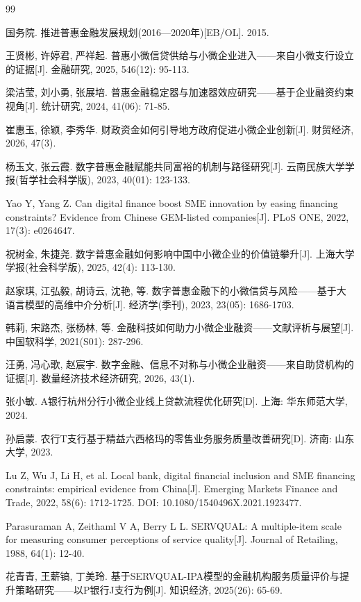 \begin{thebibliography}{99}

 国务院. 推进普惠金融发展规划(2016—2020年)[EB/OL]. 2015.

 王贤彬, 许婷君, 严祥起. 普惠小微信贷供给与小微企业进入——来自小微支行设立的证据[J]. 金融研究, 2025, 546(12): 95-113.

 梁洁莹, 刘小勇, 张展培. 普惠金融稳定器与加速器效应研究——基于企业融资约束视角[J]. 统计研究, 2024, 41(06): 71-85.

 崔惠玉, 徐颖, 李秀华. 财政资金如何引导地方政府促进小微企业创新[J]. 财贸经济, 2026, 47(3).

 杨玉文, 张云霞. 数字普惠金融赋能共同富裕的机制与路径研究[J]. 云南民族大学学报(哲学社会科学版), 2023, 40(01): 123-133.

 Yao Y, Yang Z. Can digital finance boost SME innovation by easing financing constraints? Evidence from Chinese GEM-listed companies[J]. PLoS ONE, 2022, 17(3): e0264647.

 祝树金, 朱捷尧. 数字普惠金融如何影响中国中小微企业的价值链攀升[J]. 上海大学学报(社会科学版), 2025, 42(4): 113-130.

 赵家琪, 江弘毅, 胡诗云, 沈艳, 等. 数字普惠金融下的小微信贷与风险——基于大语言模型的高维中介分析[J]. 经济学(季刊), 2023, 23(05): 1686-1703.

 韩莉, 宋路杰, 张杨林, 等. 金融科技如何助力小微企业融资——文献评析与展望[J]. 中国软科学, 2021(S01): 287-296.

 汪勇, 冯心歌, 赵宸宇. 数字金融、信息不对称与小微企业融资——来自助贷机构的证据[J]. 数量经济技术经济研究, 2026, 43(1).

 张小敏. A银行杭州分行小微企业线上贷款流程优化研究[D]. 上海: 华东师范大学, 2024.

 孙启蒙. 农行T支行基于精益六西格玛的零售业务服务质量改善研究[D]. 济南: 山东大学, 2023.

 Lu Z, Wu J, Li H, et al. Local bank, digital financial inclusion and SME financing constraints: empirical evidence from China[J]. Emerging Markets Finance and Trade, 2022, 58(6): 1712-1725. DOI: 10.1080/1540496X.2021.1923477.

 Parasuraman A, Zeithaml V A, Berry L L. SERVQUAL: A multiple-item scale for measuring consumer perceptions of service quality[J]. Journal of Retailing, 1988, 64(1): 12-40.

 花青青, 王薪镐, 丁美玲. 基于SERVQUAL-IPA模型的金融机构服务质量评价与提升策略研究——以P银行J支行为例[J]. 知识经济, 2025(26): 65-69.


\end{thebibliography}
